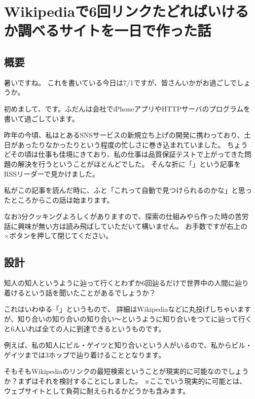 
\section{Wikipediaで6回リンクたどればいけるか調べるサイトを一日で作った話}
\subsection{概要}
暑いですね。
これを書いている今日は7/1ですが、皆さんいかがお過ごしでしょうか。

初めまして、です。ふだんは会社でiPhoneアプリやHTTPサーバのプログラムを書いて過ごしています。

昨年の今頃、私はとあるSNSサービスの新規立ち上げの開発に携わっており、土日があったりなかったりという程度の忙しさに巻き込まれていました。
ちょうどその頃は仕事も佳境にきており、私の仕事は品質保証テストで上がってきた問題の解決を行うということがほとんどでした。
そんな折に「」という記事をRSSリーダーで見かけました。

私がこの記事を読んだ時に、ふと「これって自動で見つけられるのかな」と思ったところからこの話は始まります。

なお3分クッキングよろしくがありますので、探索の仕組みやら作った時の苦労話に興味が無い方は読み飛ばしていただいて構いません。
お手数ですが右上の×ボタンを押して閉じてください。

\subsection{設計}
知人の知人というように辿って行くとわずか6回辿るだけで世界中の人間に辿り着けるという話を聞いたことがあるでしょうか？

これはいわゆる「」というもので、
詳細はWikipediaなどに丸投げしちゃいますが、知り合いの知り合いの知り合い〜というように知り合いをつてに辿って行くと6人いれば全ての人に到達できるというものです。

例えば、私の知人にビル・ゲイツと知り合いという人がいるので、私からビル・ゲイツまでは3ホップで辿り着けることとなります。

そもそもWikipediaのリンクの最短検索ということが現実的に可能なのでしょうか？まずはそれを検討することにしました。
※ここでいう現実的に可能とは、ウェブサイトとして負荷に耐えられるかどうかも含みます。

